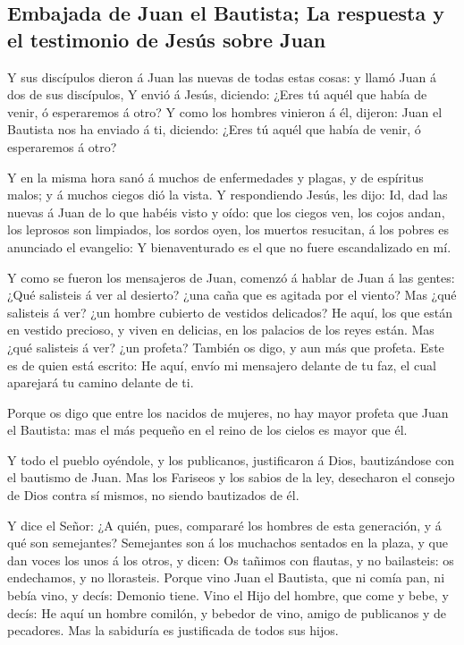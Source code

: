 \hypertarget{embajada-de-juan-el-bautista-la-respuesta-y-el-testimonio-de-jesuxfas-sobre-juan}{%
\subsection{Embajada de Juan el Bautista; La respuesta y el testimonio
de Jesús sobre
Juan}\label{embajada-de-juan-el-bautista-la-respuesta-y-el-testimonio-de-jesuxfas-sobre-juan}}

 Y sus discípulos dieron á Juan las nuevas de todas estas
cosas: y llamó Juan á dos de sus discípulos,  Y envió á
Jesús, diciendo: ¿Eres tú aquél que había de venir, ó esperaremos á
otro?  Y como los hombres vinieron á él, dijeron: Juan el
Bautista nos ha enviado á ti, diciendo: ¿Eres tú aquél que había de
venir, ó esperaremos á otro?

 Y en la misma hora sanó á muchos de enfermedades y
plagas, y de espíritus malos; y á muchos ciegos dió la vista.
 Y respondiendo Jesús, les dijo: Id, dad las nuevas á
Juan de lo que habéis visto y oído: que los ciegos ven, los cojos andan,
los leprosos son limpiados, los sordos oyen, los muertos resucitan, á
los pobres es anunciado el evangelio:  Y bienaventurado
es el que no fuere escandalizado en mí.

 Y como se fueron los mensajeros de Juan, comenzó á
hablar de Juan á las gentes: ¿Qué salisteis á ver al desierto? ¿una caña
que es agitada por el viento?  Mas ¿qué salisteis á ver?
¿un hombre cubierto de vestidos delicados? He aquí, los que están en
vestido precioso, y viven en delicias, en los palacios de los reyes
están.  Mas ¿qué salisteis á ver? ¿un profeta? También os
digo, y aun más que profeta.  Este es de quien está
escrito: He aquí, envío mi mensajero delante de tu faz, el cual
aparejará tu camino delante de ti.

 Porque os digo que entre los nacidos de mujeres, no hay
mayor profeta que Juan el Bautista: mas el más pequeño en el reino de
los cielos es mayor que él.

 Y todo el pueblo oyéndole, y los publicanos,
justificaron á Dios, bautizándose con el bautismo de Juan.
 Mas los Fariseos y los sabios de la ley, desecharon el
consejo de Dios contra sí mismos, no siendo bautizados de él.

 Y dice el Señor: ¿A quién, pues, compararé los hombres
de esta generación, y á qué son semejantes?  Semejantes
son á los muchachos sentados en la plaza, y que dan voces los unos á los
otros, y dicen: Os tañimos con flautas, y no bailasteis: os endechamos,
y no llorasteis.  Porque vino Juan el Bautista, que ni
comía pan, ni bebía vino, y decís: Demonio tiene.  Vino
el Hijo del hombre, que come y bebe, y decís: He aquí un hombre comilón,
y bebedor de vino, amigo de publicanos y de pecadores. 
Mas la sabiduría es justificada de todos sus hijos.

